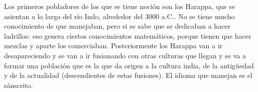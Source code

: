 Los primeros pobladores de los que se tiene noción son los Harappa, que se asientan a lo largo del río Indo, alrededor del 3000 a.C.. No se tiene mucho conocimiento de que manejaban, pero si se sabe que se dedicaban a hacer ladrillos: eso genera ciertos conocimientos matemáticos, porque tienen que hacer mezclas y aparte los comerciaban. Posteriormente los Harappa van a ir desapareciendo y se van a ir fusionando con otras culturas que llegan y se va a formar una población que es la que da origen a la cultura india, de la antigüedad y de la actualidad (descendientes de estas fusiones). El idioma que manejan es el sánscrito.